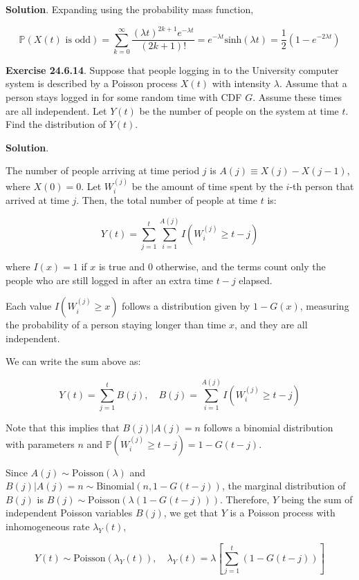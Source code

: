 \textbf{Solution}. Expanding using the probability mass function,

\[
\mathbb{P}(X(t) \text{ is odd}) = \sum_{k=0}^{\infty} \frac{(\lambda t)^{2k + 1} e^{-\lambda t}}{(2k + 1)!} = e^{-\lambda t} \text{sinh} (\lambda t) = \frac{1}{2}\left( 1 - e^{-2 \lambda t}\right)
\]

\textbf{Exercise 24.6.14}. Suppose that people logging in to the
University computer system is described by a Poisson process \(X(t)\)
with intensity \(\lambda\). Assume that a person stays logged in for
some random time with CDF \(G\). Assume these times are all independent.
Let \(Y(t)\) be the number of people on the system at time \(t\). Find
the distribution of \(Y(t)\).

\textbf{Solution}.

The number of people arriving at time period \(j\) is
\(A(j) \equiv X(j) - X(j-1)\), where \(X(0) = 0\). Let \(W_{i}^{(j)}\) be
the amount of time spent by the \(i\)-th person that arrived at time
\(j\). Then, the total number of people at time \(t\) is:

\[ Y(t) = \sum_{j=1}^t \sum_{i=1}^{A(j)} I\left(W_{i}^{(j)} \geq t - j\right) \]

where \(I(x) = 1\) if \(x\) is true and \(0\) otherwise, and the terms
count only the people who are still logged in after an extra time
\(t - j\) elapsed.

Each value \(I\left(W_{i}^{(j)} \geq x\right)\) follows a distribution
given by \(1 - G(x)\), measuring the probability of a person staying
longer than time \(x\), and they are all independent.

We can write the sum above as:

\[ Y(t) = \sum_{j=1}^t B(j), \quad B(j) =\sum_{i = 1}^{A(j)} I\left(W_{i}^{(j)} \geq t - j\right) \]

Note that this implies that \(B(j) | A(j) = n\) follows a binomial
distribution with parameters \(n\) and
\(\mathbb{P}\left(W_{i}^{(j)} \geq t - j \right) = 1 - G(t - j)\).

Since \(A(j) \sim \text{Poisson}(\lambda)\) and
\(B(j) | A(j) = n \sim \text{Binomial}(n, 1 - G(t - j))\), the marginal
distribution of \(B(j)\) is
\(B(j) \sim \text{Poisson}\left(\lambda (1 - G(t - j))\right)\).
Therefore, \(Y\) being the sum of independent Poisson variables
\(B(j)\), we get that \(Y\) is a Poisson process with inhomogeneous rate
\(\lambda_Y(t)\),

\[ Y(t) \sim \text{Poisson}\left( \lambda_Y(t) \right), \quad \lambda_Y(t) = \lambda \left[ \sum_{j=1}^t(1 - G(t - j)) \right]\]

